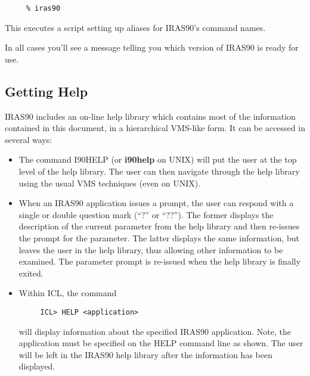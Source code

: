 \small
\begin{verbatim}
     % iras90
\end{verbatim}
\normalsize
This executes a script setting up aliases for {\small IRAS90}'s command names.

In all cases you'll see a message telling you which version of {\small IRAS90}
is ready for use.

\subsection{Getting Help}
{\small IRAS90} includes an on-line help library which contains most of the
information contained in this document, in a hierarchical VMS-like form. It can
be accessed in several ways:
\begin {itemize}
\item The command {\small I90HELP} (or {\bf i90help} on {\small UNIX}) will put
the user at the top level of the help library. The user can then navigate
through the help library using the usual {\small VMS} techniques (even on
{\small UNIX}). \item When an {\small IRAS90} application issues a prompt, the
user can respond with a single or double question mark (``?'' or ``??''). The
former displays the description of the current parameter from the help library
and then re-issues the prompt for the parameter. The latter displays the same
information, but leaves the user in the help library, thus allowing other
information to be examined. The parameter prompt is re-issued when the help
library is finally exited.
\item Within {\small ICL}, the command

\small
\begin{verbatim}
     ICL> HELP <application>
\end{verbatim}
\normalsize
will display information about the specified {\small IRAS90} application. Note,
the application must be specified on the {\small HELP} command line as shown. The user
will be left in the {\small IRAS90} help library after the information has been
displayed.
\end{itemize}

